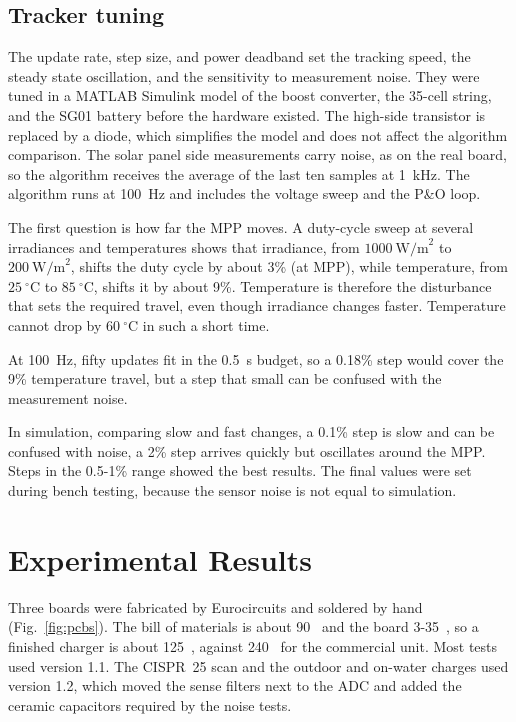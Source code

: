 \documentclass[conference]{IEEEtran}
\begin{document}
    \subsection{Tracker tuning}

    The update rate, step size, and power deadband set the tracking speed, the steady state oscillation, and the sensitivity to measurement noise. They were tuned in a MATLAB Simulink model of the boost converter, the 35-cell string, and the SG01 battery before the hardware existed. The high-side transistor is replaced by a diode, which simplifies the model and does not affect the algorithm comparison. The solar panel side measurements carry noise, as on the real board, so the algorithm receives the average of the last ten samples at 1~kHz. The algorithm runs at 100~Hz and includes the voltage sweep and the P\&O loop.

    The first question is how far the MPP moves. A duty-cycle sweep at several irradiances and temperatures shows that irradiance, from $1000~\mathrm{W/m}^2$ to $200~\mathrm{W/m}^2$, shifts the duty cycle by about 3\% (at MPP), while temperature, from $25~^\circ\mathrm{C}$ to $85~^\circ\mathrm{C}$, shifts it by about 9\%. Temperature is therefore the disturbance that sets the required travel, even though irradiance changes faster. Temperature cannot drop by $60~^\circ\mathrm{C}$ in such a short time.

    At 100~Hz, fifty updates fit in the 0.5~s budget, so a 0.18\% step would cover the 9\% temperature travel, but a step that small can be confused with the measurement noise. 
    
    In simulation, comparing slow and fast changes, a 0.1\% step is slow and can be confused with noise, a 2\% step arrives quickly but oscillates around the MPP. Steps in the 0.5-1\% range showed the best results. The final values were set during bench testing, because the sensor noise is not equal to simulation.


\section{Experimental Results}
\label{sec:results}

    Three boards were fabricated by Eurocircuits and soldered by hand (Fig.~\ref{fig:pcbs}). The bill of materials is about 90~\texteuro{} and the board 3-35~\texteuro{}, so a finished charger is about 125~\texteuro{}, against 240~\texteuro{} for the commercial unit. Most tests used version 1.1. The CISPR~25 scan and the outdoor and on-water charges used version 1.2, which moved the sense filters next to the ADC and added the ceramic capacitors required by the noise tests.
\end{document}
